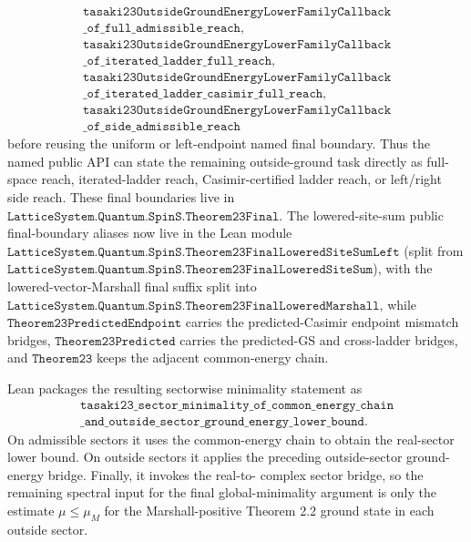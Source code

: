 \documentclass[a4paper,11pt]{article}
\begin{document}
\[
\begin{gathered}
\texttt{tasaki23OutsideGroundEnergyLowerFamilyCallback}\\
\texttt{\_of\_full\_admissible\_reach},\\
\texttt{tasaki23OutsideGroundEnergyLowerFamilyCallback}\\
\texttt{\_of\_iterated\_ladder\_full\_reach},\\
\texttt{tasaki23OutsideGroundEnergyLowerFamilyCallback}\\
\texttt{\_of\_iterated\_ladder\_casimir\_full\_reach},\\
\texttt{tasaki23OutsideGroundEnergyLowerFamilyCallback}\\
\texttt{\_of\_side\_admissible\_reach}
\end{gathered}
\]
before reusing the uniform or left-endpoint named final boundary.  Thus the
named public API can state the remaining outside-ground task directly as
full-space reach, iterated-ladder reach, Casimir-certified ladder reach, or
left/right side reach.  These final boundaries live in
\(\texttt{LatticeSystem.Quantum.SpinS.Theorem23Final}\).  The lowered-site-sum
public final-boundary aliases now
live in the Lean module
\(\texttt{LatticeSystem.Quantum.SpinS.Theorem23FinalLoweredSiteSumLeft}\)
(split from
\(\texttt{LatticeSystem.Quantum.SpinS.Theorem23FinalLoweredSiteSum}\)), with the
lowered-vector-Marshall final suffix split into
\(\texttt{LatticeSystem.Quantum.SpinS.Theorem23FinalLoweredMarshall}\), while
\(\texttt{Theorem23PredictedEndpoint}\) carries the predicted-Casimir
endpoint mismatch bridges,
\(\texttt{Theorem23Predicted}\) carries the predicted-GS and cross-ladder
bridges, and
\(\texttt{Theorem23}\) keeps the adjacent common-energy chain.

Lean packages the resulting sectorwise minimality statement as
\[
\begin{gathered}
\texttt{tasaki23\_sector\_minimality\_of\_common\_energy\_chain}\\
\texttt{\_and\_outside\_sector\_ground\_energy\_lower\_bound}.
\end{gathered}
\]
On admissible sectors it uses the common-energy chain to obtain the
real-sector lower bound.  On outside sectors it applies the preceding
outside-sector ground-energy bridge.  Finally, it invokes the real-to-
complex sector bridge, so the remaining spectral input for the final
global-minimality argument is only the estimate \(\mu\le\mu_M\) for the
Marshall-positive Theorem 2.2 ground state in each outside sector.
\end{document}
